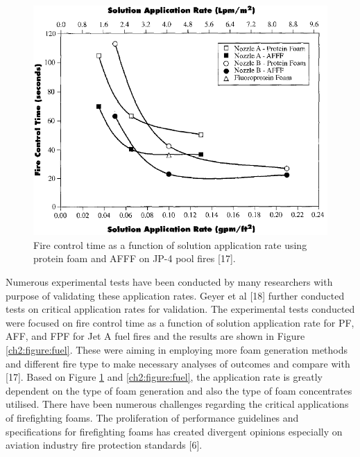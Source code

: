 \documentclass[12pt]{report}
\begin{document}
\begin{figure}[H]
    \centering
    \includegraphics[width=\textwidth]{fire_control_time_pool_fires.png}
    \caption{Fire control time as a function of solution application rate using protein foam and AFFF on JP-4 pool fires [17].}
    \label{ch2:figure:pool}
\end{figure}

Numerous experimental tests have been conducted by many researchers with purpose of validating these application rates. Geyer et al [18] further conducted tests on critical application rates for validation. The experimental tests conducted were focused on fire control time as a function of solution application rate for PF, AFF, and FPF for Jet A fuel fires and the results are shown in Figure \ref{ch2:figure:fuel}. These were aiming in employing more foam generation methods and different fire type to make necessary analyses of outcomes and compare with [17]. Based on Figure \ref{ch2:figure:pool} and \ref{ch2:figure:fuel}, the application rate is greatly dependent on the type of foam generation and also the type of foam concentrates utilised. There have been numerous challenges regarding the critical applications of firefighting foams. The proliferation of performance guidelines and specifications for firefighting foams has created divergent opinions especially on aviation industry fire protection standards [6].
\end{document}
